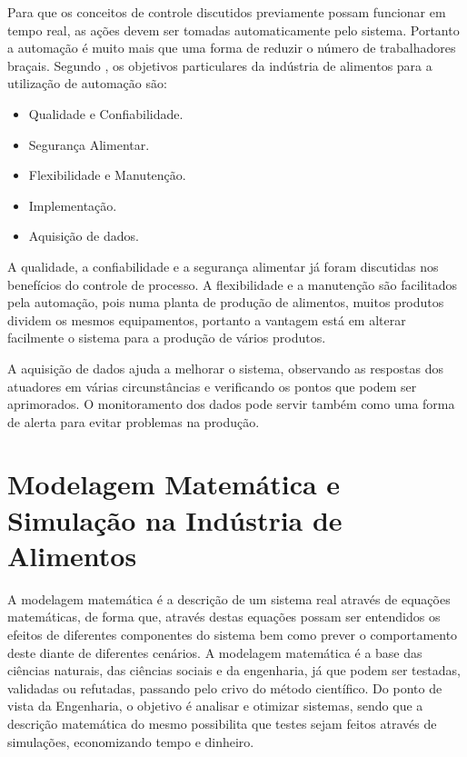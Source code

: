 Para que os conceitos de controle discutidos previamente possam funcionar em tempo real, as ações devem ser tomadas automaticamente pelo sistema. Portanto a automação é muito mais que uma forma de reduzir o número de trabalhadores braçais. 
Segundo \citet{process-monitoring-online}, os objetivos particulares da indústria de alimentos para a utilização de automação são: 

\begin{itemize}
  \item Qualidade e Confiabilidade.
  \item Segurança Alimentar.
  \item Flexibilidade e Manutenção.
  \item Implementação. 
  \item Aquisição de dados.
\end{itemize}

A qualidade, a confiabilidade e a segurança alimentar já foram discutidas nos benefícios do controle de processo. A flexibilidade e a manutenção são facilitados pela automação, pois numa planta de produção de alimentos, muitos produtos dividem os mesmos equipamentos, portanto a vantagem está em alterar facilmente o sistema para a produção de vários produtos. 

A aquisição de dados ajuda a melhorar o sistema, observando as respostas dos atuadores em várias circunstâncias e verificando os pontos que podem ser aprimorados. O monitoramento dos dados pode servir também como uma forma de alerta para evitar problemas na produção.


\section{Modelagem Matemática e Simulação na Indústria de Alimentos}\label{diffinitas}

A modelagem matemática é a descrição de um sistema real através de equações matemáticas, de forma que, através destas equações possam ser entendidos os efeitos de diferentes componentes do sistema bem como prever o comportamento deste diante de diferentes cenários. A modelagem matemática é a base das ciências naturais, das ciências sociais e da engenharia, já que podem ser testadas, validadas ou refutadas, passando pelo crivo do método científico. Do ponto de vista da Engenharia, o objetivo é analisar e otimizar sistemas, sendo que a descrição matemática do mesmo possibilita que testes sejam feitos através de simulações, economizando tempo e dinheiro. 

